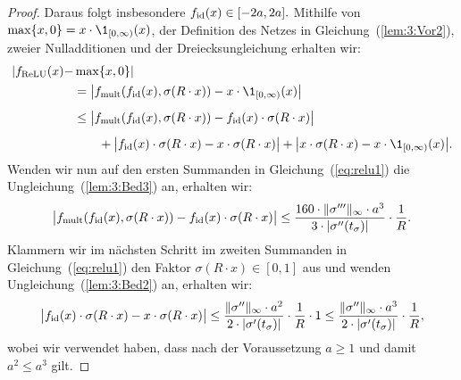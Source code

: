 \begin{proof}
Daraus folgt insbesondere $f_{\mathrm{id}}(x) \in [-2a, 2a].$
Mithilfe von $\max\{x, 0 \} = x \cdot \1_{[0, \infty)}(x)$, der Definition des Netzes in Gleichung~(\ref{lem:3:Vor2}), zweier Nulladditionen und der Dreiecksungleichung erhalten wir:
\begin{equation}
\label{eq:relu1}
\begin{split}
|f_{\ReLU}(x) - & \max\{x, 0\}|  \\
& = \big| f_{\mult}(f_{\id}(x), \sigma(R \cdot x)) - x \cdot \1_{[0, \infty)}(x)\big| \\[0.5em]
& \leq \big| f_{\mult}(f_{\id}(x), \sigma(R \cdot x)) - f_{\id}(x)\cdot\sigma(R \cdot x)\big| \\[0.5em]
& \qquad + \big| f_{\id}(x)\cdot\sigma(R \cdot x) - x \cdot \sigma(R \cdot x)\big| + \big| x \cdot \sigma(R \cdot x) - x \cdot \1_{[0, \infty)}(x)\big|. 
\end{split}
\end{equation}
Wenden wir nun auf den ersten Summanden in Gleichung~(\ref{eq:relu1}) die Ungleichung~(\ref{lem:3:Bed3}) an, erhalten wir:
\begin{equation}
\label{eq:relu2}
\big| f_{\mathrm{mult}}(f_{\mathrm{id}}(x), \sigma(R \cdot x)) - f_{\mathrm{id}}(x)\cdot\sigma(R \cdot x)\big| \leq \frac{160 \cdot \|\sigma'''\|_{\infty} \cdot a ^3}{3 \cdot |\sigma''(t_{\sigma})|} \cdot \frac{1}{R}.
\end{equation}
Klammern wir im nächsten Schritt im zweiten Summanden in Gleichung~(\ref{eq:relu1}) den Faktor $\sigma(R \cdot x) \in [0, 1]$ aus und wenden Ungleichung~(\ref{lem:3:Bed2}) an, erhalten wir:
\begin{equation}
\label{eq:relu3}
\big| f_{\mathrm{id}}(x)\cdot\sigma(R \cdot x) - x \cdot \sigma(R \cdot x)\big| \leq \frac{\|\sigma''\|_{\infty} \cdot a^2}{2 \cdot |\sigma'(t_{\sigma})|} \cdot \frac{1}{R} \cdot 1 \leq \frac{\|\sigma''\|_{\infty} \cdot a^3}{2 \cdot |\sigma'(t_{\sigma})|} \cdot \frac{1}{R},
\end{equation}
wobei wir verwendet haben, dass nach der Voraussetzung $a \geq 1$ und damit $a^2 \leq a^3$ gilt.


\end{proof}
